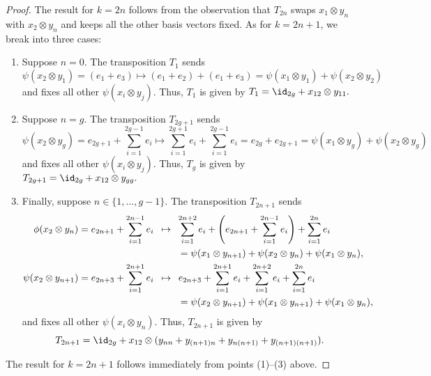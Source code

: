 \begin{proof} 	
	The result for $k = 2n$ follows from the observation that $T_{2n}$ swaps $x_1 \otimes y_n$ with $x_2 \otimes y_n$ and keeps all the other basis vectors fixed. As for $k = 2n+1$, we break into three cases:  
	\begin{enumerate} 
		\item Suppose $n = 0$. The transposition $T_1$ sends 
		$$\psi(x_2 \otimes y_1) = ( e_1 + e_3)  \mapsto (e_1 + e_2) + (e_1 + e_3) 
		= \psi(x_1 \otimes y_1) + \psi(x_2 \otimes y_2)$$
		and fixes all other $\psi(x_i \otimes y_j)$. Thus, $T_1$ is given by 
		\(
		T_1 = \id_{2g} + x_{12} \otimes y_{11}. 
		\)
		\item Suppose $n = g$. The transposition $T_{2g+1}$ sends 
		$$ \psi(x_2 \otimes y_g) = e_{2g + 1} + \sum_{i=1}^{2g-1} e_i  \mapsto  \sum_{i=1}^{2g+1} e_i + \sum_{i=1}^{2g-1} e_i  = e_{2g} + e_{2g+1} = \psi(x_1 \otimes y_g) + \psi(x_2 \otimes y_g) $$
		and fixes all other $\psi(x_i \otimes y_j)$. Thus, $T_g$ is given by 
		\(
		T_{2g+1} = \id_{2g} + x_{12} \otimes y_{gg}. 
		\)
		\item Finally, suppose $n \in \{1, \dots, g-1\}$. The transposition $T_{2n+1}$ sends 
		\begin{align*}
		\phi(x_2 \otimes y_n) = e_{2n + 1} + \sum_{i=1}^{2n-1} e_i \,\,\, & \mapsto \,\,\, \sum_{i=1}^{2n+2} e_i + \left( e_{2n+1} + \sum_{i=1}^{2n-1} e_i \right) + \sum_{i=1}^{2n} e_i \\
		&\hphantom{\quad\mapsto}= \psi(x_1 \otimes y_{n+1}) + \psi(x_2 \otimes y_n) + \psi(x_1 \otimes y_n), \\
		\psi(x_2 \otimes y_{n+1}) 
		=  e_{2n + 3} + \sum_{i=1}^{2n+1} e_i \,\,\, &\mapsto \,\,\, e_{2n+3} + \sum_{i=1}^{2n+1} e_i + \sum_{i=1}^{2n+2} e_i + \sum_{i=1}^{2n} e_i \\
		&\hphantom{\quad\mapsto}= \psi(x_2 \otimes y_{n+1}) + \psi(x_1 \otimes y_{n+1}) + \psi(x_1 \otimes y_n), 
		\end{align*} 
		and fixes all other $\psi(x_i \otimes y_n)$. Thus, $T_{2n+1}$ is given by 
		\[
		T_{2n+1} = \id_{2g} + x_{12} \otimes (y_{nn} + y_{(n+1) n} + y_{n (n+1)} + y_{(n+1) (n+1)}). 
		\]
	\end{enumerate} 
	The result for $k = 2n+1$ follows immediately from points (1)--(3) above.
\end{proof} 

